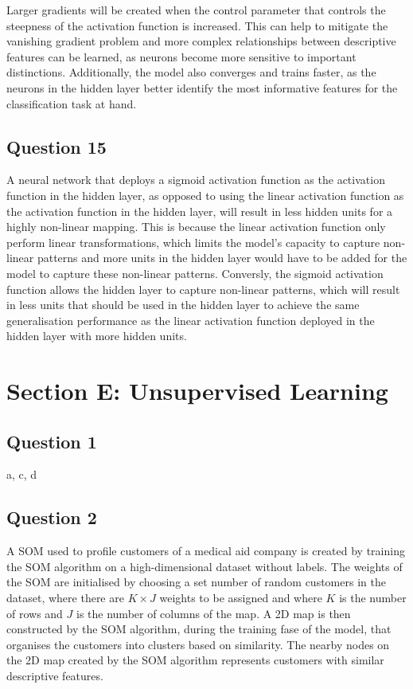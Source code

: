 \documentclass[10pt]{article}
\begin{document}
Larger gradients will be created when the control parameter that controls the steepness of the activation function is increased.
This can help to mitigate the vanishing gradient problem and more complex relationships between descriptive features can be learned,
as neurons become more sensitive to important distinctions.
Additionally, the model also converges and trains faster, as the neurons in the hidden layer better identify the most informative features
for the classification task at hand.

\subsection*{Question 15}

A neural network that deploys a sigmoid activation function as the activation function in the hidden layer, as
opposed to using the linear activation function as the activation function in the hidden layer, will
result in less hidden units for a highly non-linear mapping. This is because the linear activation
function only perform linear transformations, which limits the model's capacity to capture non-linear
patterns and more units in the hidden layer would have to be added for the model to capture these non-linear patterns.
Conversly, the sigmoid activation function allows the hidden layer to capture non-linear patterns, which
will result in less units that should be used in the hidden layer to achieve the same generalisation
performance as the linear activation function deployed in the hidden layer with more hidden units.  

\section*{Section E: Unsupervised Learning}

\subsection*{Question 1}

a, c, d

\subsection*{Question 2}

A SOM used to profile customers of a medical aid company is created by training the SOM algorithm on
a high-dimensional dataset without labels. The weights of the SOM are initialised by choosing a set number
of random customers in the dataset, where there are $K \times J$ weights to be assigned and where $K$ is the number
of rows and $J$ is the number of columns of the map. A 2D map is then constructed by the SOM algorithm, during
the training fase of the model, that organises the customers into clusters based on similarity. The nearby
nodes on the 2D map created by the SOM algorithm represents customers with similar descriptive features.
\end{document}
